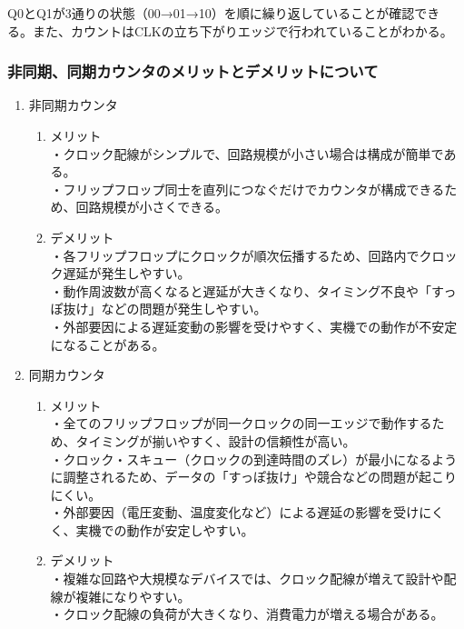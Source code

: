 \documentclass{jlreq}
\numberwithin{equation}{section}
\begin{document}
Q0とQ1が3通りの状態（00→01→10）を順に繰り返していることが確認できる。また、カウントはCLKの立ち下がりエッジで行われていることがわかる。

\subsubsection{非同期、同期カウンタのメリットとデメリットについて}
\begin{enumerate}
  \item 非同期カウンタ
  \begin{enumerate}
    \item メリット \\
    ・クロック配線がシンプルで、回路規模が小さい場合は構成が簡単である。\\
    ・フリップフロップ同士を直列につなぐだけでカウンタが構成できるため、回路規模が小さくできる。\\
    \item デメリット \\
    ・各フリップフロップにクロックが順次伝播するため、回路内でクロック遅延が発生しやすい。\\
    ・動作周波数が高くなると遅延が大きくなり、タイミング不良や「すっぽ抜け」などの問題が発生しやすい。\\
    ・外部要因による遅延変動の影響を受けやすく、実機での動作が不安定になることがある。\\
  \end{enumerate}
   \item 同期カウンタ
  \begin{enumerate}
    \item メリット \\
    ・全てのフリップフロップが同一クロックの同一エッジで動作するため、タイミングが揃いやすく、設計の信頼性が高い。\\
    ・クロック・スキュー（クロックの到達時間のズレ）が最小になるように調整されるため、データの「すっぽ抜け」や競合などの問題が起こりにくい。\\
    ・外部要因（電圧変動、温度変化など）による遅延の影響を受けにくく、実機での動作が安定しやすい。
    \item デメリット \\
    ・複雑な回路や大規模なデバイスでは、クロック配線が増えて設計や配線が複雑になりやすい。\\
    ・クロック配線の負荷が大きくなり、消費電力が増える場合がある。
  \end{enumerate}
\end{enumerate}
\end{document}
